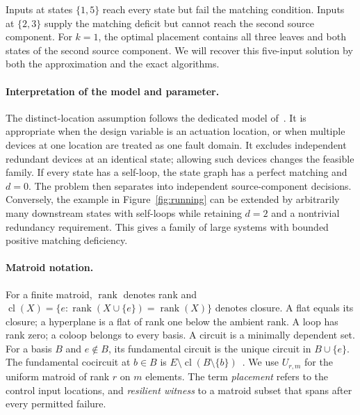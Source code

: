 \documentclass[11pt]{article}
\theoremstyle{definition}
\theoremstyle{remark}\newtheorem{remark}[theorem]{Remark}
\DeclareMathOperator{\rk}{rank}
\DeclareMathOperator{\cl}{cl}
\begin{document}
Inputs at states $\{1,5\}$ reach every state but fail the matching
condition. Inputs at $\{2,3\}$ supply the matching deficit but
cannot reach the second source component. For $k=1$, the optimal
placement contains all three leaves and both states of the second
source component. We will recover this five-input solution by
both the approximation and the exact algorithms.

\paragraph{Interpretation of the model and parameter.}
The distinct-location assumption follows the dedicated model
of~\cite{PPR}. It is appropriate when the design variable is an
actuation location, or when multiple devices at one location are
treated as one fault domain. It excludes independent redundant
devices at an identical state; allowing such devices changes the
feasible family. If every state has a self-loop, the state graph
has a perfect matching and $d=0$. The problem then separates into
independent source-component decisions. Conversely, the example
in Figure~\ref{fig:running} can be extended by arbitrarily many
downstream states with self-loops while retaining $d=2$ and a
nontrivial redundancy requirement. This gives a family of
large systems with bounded positive matching deficiency.

\paragraph{Matroid notation.}
For a finite matroid, $\rk$ denotes rank and
$\cl(X)=\{e:\rk(X\cup\{e\})=\rk(X)\}$ denotes closure.
A flat equals its closure; a hyperplane is a flat of rank one
below the ambient rank. A loop has rank zero; a coloop belongs
to every basis. A circuit is a minimally dependent set.
For a basis $B$ and $e\notin B$, its fundamental circuit is the
unique circuit in $B\cup\{e\}$. The fundamental cocircuit at
$b\in B$ is $E\setminus\cl(B\setminus\{b\})$~\cite{Oxley}.
We use $U_{r,m}$ for the uniform matroid of rank $r$ on $m$ elements.
The term \emph{placement} refers to the control input locations,
and \emph{resilient witness} to a matroid subset that spans after
every permitted failure.
\end{document}
